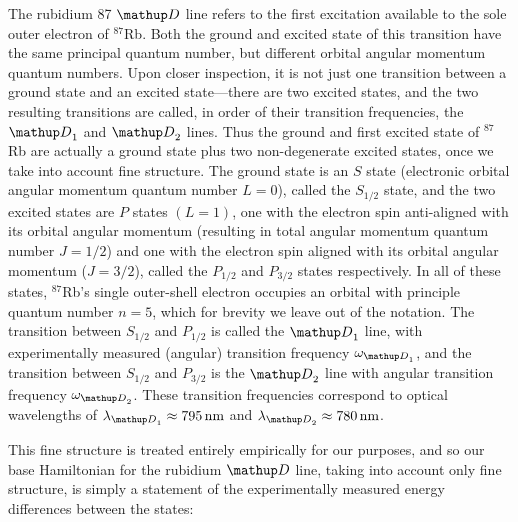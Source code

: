 The rubidium 87 $\up{D}$ line refers to the first excitation available to the sole outer electron of $^{87}$Rb. Both the ground and excited state of this transition have the same principal quantum number, but different orbital angular momentum quantum numbers. Upon closer inspection, it is not just one transition between a ground state and an excited state---there are two excited states, and the two resulting transitions are called, in order of their transition frequencies, the $\up{D}_1$ and  $\up{D}_2$ lines. Thus the ground and first excited state of $^{87}$Rb are actually a ground state plus two non-degenerate excited states, once we take into account fine structure. The ground state is an $S$ state (electronic orbital angular momentum quantum number $L=0$), called the $S_{1/2}$ state, and the two excited states are $P$ states $(L=1)$, one with the electron spin anti-aligned with its orbital angular momentum (resulting in total angular momentum quantum number $J=1/2$) and one with the electron spin aligned with its orbital angular momentum ($J=3/2$), called the $P_{1/2}$ and $P_{3/2}$ states respectively. In all of these states, $^{87}$Rb's single outer-shell electron occupies an orbital with principle quantum number $n=5$, which for brevity we leave out of the notation. The transition between $S_{1/2}$ and $P_{1/2}$ is called the $\up{D}_1$ line, with experimentally measured (angular) transition frequency $\omega_{\up{D}_1}$, and the transition between $S_{1/2}$ and $P_{3/2}$ is the $\up{D}_2$ line with angular transition frequency $\omega_{\up{D}_2}$. These transition frequencies correspond to optical wavelengths of $\lambda_{\up{D}_1} \approx 795\unit{nm}$ and $\lambda_{\up{D}_2} \approx 780\unit{nm}$\cite{steck_rubidium_2015}.

This fine structure is treated entirely empirically for our purposes, and so our base Hamiltonian for the rubidium $\up{D}$ line, taking into account only fine structure, is simply a statement of the experimentally measured energy differences between the states:

